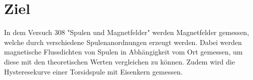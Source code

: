 \section{Ziel}
\label{sec:Ziel}

In dem Versuch 308 "Spulen und Magnetfelder" werden Magnetfelder gemessen, welche durch verschiedene 
Spulenanordnungen erzeugt werden. Dabei werden magnetische Flussdichten von Spulen in Abhängigkeit vom 
Ort gemessen, um diese mit den theoretischen Werten vergleichen zu können.
Zudem wird die Hysteresekurve einer Torsidspule mit Eisenkern gemessen.


